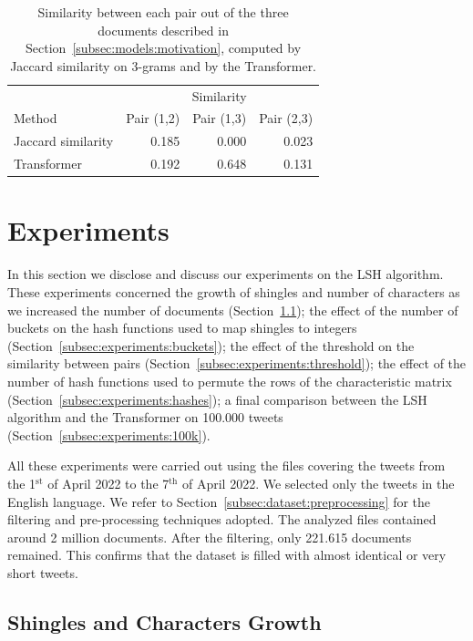 \documentclass[runningheads]{llncs}
\begin{document}
\begin{table}
  \caption{Similarity between each pair out of the three documents described in Section~\ref{subsec:models:motivation}, computed by Jaccard similarity on 3-grams and by the Transformer.}
  \label{tab:models:comparison}
  \centering
  \begin{tabular}{lrrr}
      \toprule
      & \multicolumn{3}{c}{Similarity} \\
      Method & Pair (1,2) & Pair (1,3) & Pair (2,3) \\
      \midrule
      Jaccard similarity & 0.185 & 0.000 & 0.023\\
      Transformer & 0.192 & 0.648 & 0.131 \\
      \bottomrule
  \end{tabular}
\end{table}

\section{Experiments}
\label{sec:experiments}

In this section we disclose and discuss our experiments on the LSH algorithm. These experiments concerned the growth of shingles and number of characters as we increased the number of documents (Section~\ref{subsec:experiments:shingles}); the effect of the number of buckets on the hash functions used to map shingles to integers (Section~\ref{subsec:experiments:buckets}); the effect of the threshold on the similarity between pairs (Section~\ref{subsec:experiments:threshold}); the effect of the number of hash functions used to permute the rows of the characteristic matrix (Section~\ref{subsec:experiments:hashes}); a final comparison between the LSH algorithm and the Transformer on 100.000 tweets (Section~\ref{subsec:experiments:100k}).

All these experiments were carried out using the files covering the tweets from the 1$^{\text{st}}$ of April 2022 to the 7$^{\text{th}}$ of April 2022. We selected only the tweets in the English language. We refer to Section~\ref{subsec:dataset:preprocessing} for the filtering and pre-processing techniques adopted. The analyzed files contained around 2 million documents. After the filtering, only 221.615 documents remained. This confirms that the dataset is filled with almost identical or very short tweets. 

\subsection{Shingles and Characters Growth}
\label{subsec:experiments:shingles}
\end{document}
